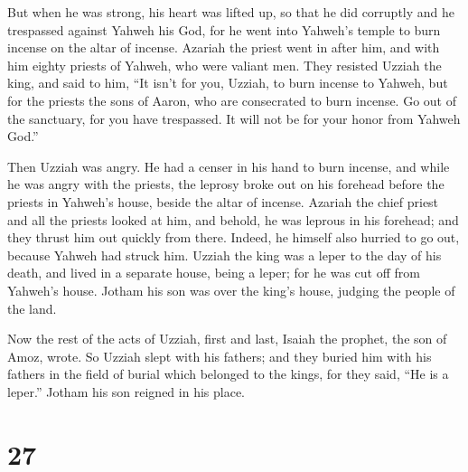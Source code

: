  But when he was strong, his heart was lifted up, so that
he did corruptly and he trespassed against Yahweh his God, for he went
into Yahweh's temple to burn incense on the altar of incense.
 Azariah the priest went in after him, and with him
eighty priests of Yahweh, who were valiant men.  They
resisted Uzziah the king, and said to him, ``It isn't for you, Uzziah,
to burn incense to Yahweh, but for the priests the sons of Aaron, who
are consecrated to burn incense. Go out of the sanctuary, for you have
trespassed. It will not be for your honor from Yahweh God.''

 Then Uzziah was angry. He had a censer in his hand to
burn incense, and while he was angry with the priests, the leprosy broke
out on his forehead before the priests in Yahweh's house, beside the
altar of incense.  Azariah the chief priest and all the
priests looked at him, and behold, he was leprous in his forehead; and
they thrust him out quickly from there. Indeed, he himself also hurried
to go out, because Yahweh had struck him.  Uzziah the
king was a leper to the day of his death, and lived in a separate house,
being a leper; for he was cut off from Yahweh's house. Jotham his son
was over the king's house, judging the people of the land.

 Now the rest of the acts of Uzziah, first and last,
Isaiah the prophet, the son of Amoz, wrote.  So Uzziah
slept with his fathers; and they buried him with his fathers in the
field of burial which belonged to the kings, for they said, ``He is a
leper.'' Jotham his son reigned in his place.

\hypertarget{section-26}{%
\section{27}\label{section-26}}

